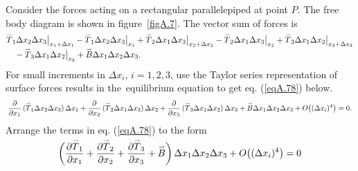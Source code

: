 \documentclass{AeroStructure-ERJohnson}
\def\harp#1{\smash{\mathord{\buildrel{\lower3pt\hbox{$\scriptscriptstyle\rightharpoonup$}}\over{#1}}}}
\begin{document}
Consider the forces acting on a rectangular parallelepiped at point $P$. The free body diagram is shown in figure~\ref{figA.7}.  The vector sum of forces is
\begin{align*}
&\harp{T}_{1} \Delta x_{2} \Delta x_{3}\big|_{x_{1} +\Delta x_{1}}-\harp{T}_{1} \Delta x_{2} \Delta x_{3}\big|_{x_{1}}+\harp{T}_{2} \Delta x_{1} \Delta x_{3}\big|_{x_{2}+\Delta x_{2}}-\harp{T}_{2} \Delta x_{1} \Delta x_{3}\big|_{x_{2}}+\harp{T}_{3} \Delta x_{1} \Delta x_{2}\big|_{x_{3}+\Delta x_{3}}\\
&\quad-\harp{T}_{3} \Delta x_{1} \Delta x_{2}\big|_{x_{3}}+\harp{B} \Delta x_{1} \Delta x_{2} \Delta x_{3}.
\end{align*}
For small increments in $\Delta x_{i}$, $i=1,2,3$, use the Taylor series representation of surface forces results in the~equil\-ibrium equation to get eq. (\ref{eqA.78}) below.
\begin{align}\label{eqA.78}
\frac{\partial}{\partial x_{1}}\left(\harp{T}_{1} \Delta x_{2} \Delta x_{3}\right) \Delta x_{1}+\frac{\partial}{\partial x_{2}}\left(\harp{T}_{2} \Delta x_{1} \Delta x_{3}\right) \Delta x_{2}+\frac{\partial}{\partial x_{3}}\left(\harp{T}_{3} \Delta x_{1} \Delta x_{2}\right) \Delta x_{3}+\harp{B} \Delta x_{1} \Delta x_{2} \Delta x_{3}+O\big((\Delta x_{i})^{4}\big)=0.
\end{align}
Arrange the terms in eq. (\ref{eqA.78}) to the form
\begin{align}\label{eqA.79}
\left(\frac{\partial \harp{T}_{1}}{\partial x_{1}}+\frac{\partial \harp{T}_{2}}{\partial x_{2}}+\frac{\partial \harp{T}_{3}}{\partial x_{3}}+\harp{B}\right) \Delta x_{1} \Delta x_{2} \Delta x_{3}+O\big((\Delta x_{i})^{4}\big)=0
\end{align}
\end{document}

